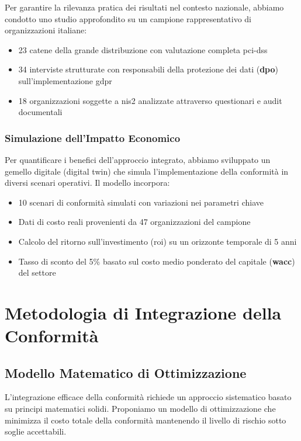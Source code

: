 Per garantire la rilevanza pratica dei risultati nel contesto nazionale, abbiamo condotto uno studio approfondito su un campione rappresentativo di organizzazioni italiane:

\begin{itemize}
    \item 23 catene della grande distribuzione con valutazione completa \gls{pci-dss}
    \item 34 interviste strutturate con responsabili della protezione dei dati (\textbf{\gls{dpo}}) sull'implementazione \gls{gdpr}
    \item 18 organizzazioni soggette a \gls{nis2} analizzate attraverso questionari e audit documentali
\end{itemize}

\subsubsection{Simulazione dell'Impatto Economico}

Per quantificare i benefici dell'approccio integrato, abbiamo sviluppato un gemello digitale (digital twin) che simula l'implementazione della conformità in diversi scenari operativi. Il modello incorpora:

\begin{itemize}
    \item 10 scenari di conformità simulati con variazioni nei parametri chiave
    \item Dati di costo reali provenienti da 47 organizzazioni del campione
    \item Calcolo del ritorno sull'investimento (\gls{roi}) su un orizzonte temporale di 5 anni
    \item Tasso di sconto del 5\% basato sul costo medio ponderato del capitale (\textbf{\gls{wacc}}) del settore
\end{itemize}

\section{Metodologia di Integrazione della Conformità}
\label{sec:4.3_metodologia}

\subsection{Modello Matematico di Ottimizzazione}
\label{subsec:4.3.1_modello}

L'integrazione efficace della conformità richiede un approccio sistematico basato su principi matematici solidi. Proponiamo un modello di ottimizzazione che minimizza il costo totale della conformità mantenendo il livello di rischio sotto soglie accettabili.

